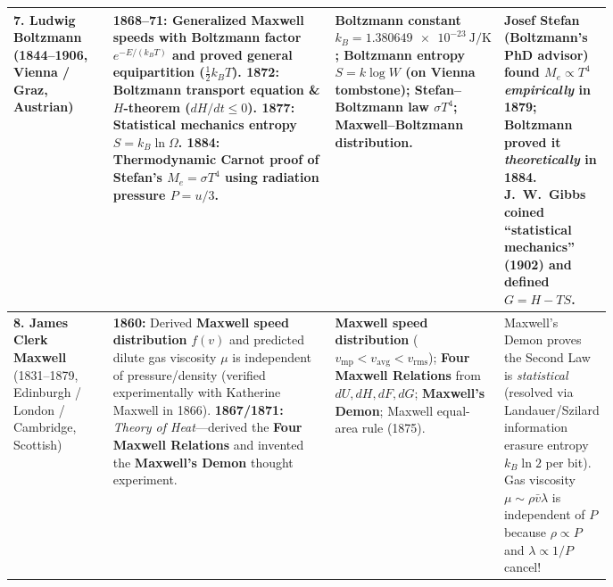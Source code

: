 \begin{center}
\begin{tabularx}{\linewidth}{@{}>{\raggedright\arraybackslash}p{0.17\linewidth} >{\raggedright\arraybackslash}p{0.39\linewidth} >{\raggedright\arraybackslash}p{0.22\linewidth} >{\raggedright\arraybackslash}X@{}}
\textbf{7. Ludwig Boltzmann} (1844--1906, Vienna / Graz, Austrian) & \textbf{1868--71:} Generalized Maxwell speeds with \textbf{Boltzmann factor} $e^{-E/(k_B T)}$ and proved general equipartition ($\tfrac{1}{2}k_B T$). \textbf{1872:} Boltzmann transport equation \& $H$-theorem ($dH/dt \leq 0$). \textbf{1877:} Statistical mechanics entropy $S = k_B\ln\Omega$. \textbf{1884:} Thermodynamic Carnot proof of Stefan's $M_e = \sigma T^4$ using radiation pressure $P = u/3$. & \textbf{Boltzmann constant} $k_B = \SI{1.380649e-23}{\joule\per\kelvin}$; \textbf{Boltzmann entropy} $S = k\log W$ (on Vienna tombstone); \textbf{Stefan--Boltzmann law} $\sigma T^4$; Maxwell--Boltzmann distribution. & Josef Stefan (Boltzmann's PhD advisor) found $M_e \propto T^4$ \emph{empirically} in 1879; Boltzmann proved it \emph{theoretically} in 1884. J.~W.~Gibbs coined ``statistical mechanics'' (1902) and defined $G = H - TS$. \\\midrule
\textbf{8. James Clerk Maxwell} (1831--1879, Edinburgh / London / Cambridge, Scottish) & \textbf{1860:} Derived \textbf{Maxwell speed distribution} $f(v)$ and predicted dilute gas viscosity $\mu$ is independent of pressure/density (verified experimentally with Katherine Maxwell in 1866). \textbf{1867/1871:} \emph{Theory of Heat}---derived the \textbf{Four Maxwell Relations} and invented the \textbf{Maxwell's Demon} thought experiment. & \textbf{Maxwell speed distribution} ($v_{\mathrm{mp}} < v_{\mathrm{avg}} < v_{\mathrm{rms}}$); \textbf{Four Maxwell Relations} from $dU, dH, dF, dG$; \textbf{Maxwell's Demon}; Maxwell equal-area rule (1875). & Maxwell's Demon proves the Second Law is \emph{statistical} (resolved via Landauer/Szilard information erasure entropy $k_B\ln 2$ per bit). Gas viscosity $\mu \sim \rho \bar{v}\lambda$ is independent of $P$ because $\rho \propto P$ and $\lambda \propto 1/P$ cancel! \\\bottomrule
\end{tabularx}
\end{center}


